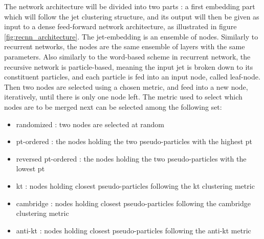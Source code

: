 The network architecture will be divided into two parts : a first embedding part which will follow the jet clustering structure, and its output will then be given as input to a dense feed-forward network architecture, as illustrated in figure \ref{fig:recnn_architecture}.
The jet-embedding is an ensemble of nodes. Similarly to recurrent networks, the nodes are the same ensemble of layers with the same parameters. Also similarly to the word-based scheme in recurrent network, the recursive network is particle-based, meaning the input jet is broken down to its constituent particles, and each particle is fed into an input node, called leaf-node. Then two nodes are selected using a chosen metric, and feed into a new node, iteratively, until there is only one node left. 
The metric used to select which nodes are to be merged next can be selected among the following set:
    
\begin{itemize}
    \item randomized : two nodes are selected at random
    \item pt-ordered : the nodes holding the two pseudo-particles with the highest pt 
    \item reversed pt-ordered : the nodes holding the two pseudo-particles with the lowest pt
    \item kt : nodes holding closest pseudo-particles following the kt clustering metric
    \item cambridge : nodes holding closest pseudo-particles following the cambridge clustering metric
    \item anti-kt : nodes holding closest pseudo-particles following the anti-kt metric
\end{itemize}

